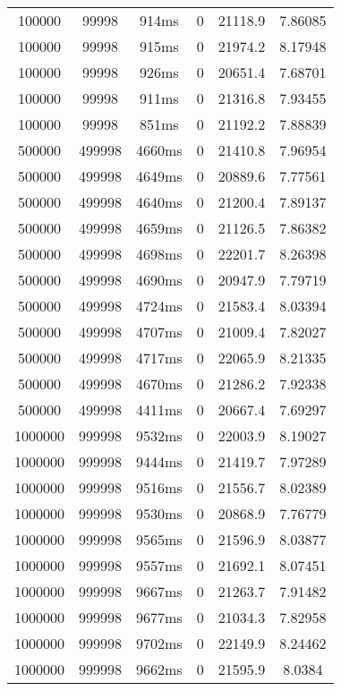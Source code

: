 \documentclass[./main.tex]{subfiles}
\begin{document}
\begin{table}
\begin{tabular}{ c | c | c | c | c | c }
        100000 & 99998 & 914ms & 0 & 21118.9 & 7.86085 \\
        100000 & 99998 & 915ms & 0 & 21974.2 & 8.17948 \\
        100000 & 99998 & 926ms & 0 & 20651.4 & 7.68701 \\
        100000 & 99998 & 911ms & 0 & 21316.8 & 7.93455 \\
        100000 & 99998 & 851ms & 0 & 21192.2 & 7.88839 \\
        \hline
        500000 & 499998 & 4660ms & 0 & 21410.8 & 7.96954 \\
        500000 & 499998 & 4649ms & 0 & 20889.6 & 7.77561 \\
        \rowcolor{lightgray} 500000 & 499998 & 4640ms & 0 & 21200.4 & 7.89137 \\
        500000 & 499998 & 4659ms & 0 & 21126.5 & 7.86382 \\
        500000 & 499998 & 4698ms & 0 & 22201.7 & 8.26398 \\
        500000 & 499998 & 4690ms & 0 & 20947.9 & 7.79719 \\
        500000 & 499998 & 4724ms & 0 & 21583.4 & 8.03394 \\
        500000 & 499998 & 4707ms & 0 & 21009.4 & 7.82027 \\
        500000 & 499998 & 4717ms & 0 & 22065.9 & 8.21335 \\
        500000 & 499998 & 4670ms & 0 & 21286.2 & 7.92338 \\
        500000 & 499998 & 4411ms & 0 & 20667.4 & 7.69297 \\
        \hline
        1000000 & 999998 & 9532ms & 0 & 22003.9 & 8.19027 \\
        1000000 & 999998 & 9444ms & 0 & 21419.7 & 7.97289 \\
        \rowcolor{lightgray} 1000000 & 999998 & 9516ms & 0 & 21556.7 & 8.02389 \\
        1000000 & 999998 & 9530ms & 0 & 20868.9 & 7.76779 \\
        1000000 & 999998 & 9565ms & 0 & 21596.9 & 8.03877 \\
        1000000 & 999998 & 9557ms & 0 & 21692.1 & 8.07451 \\
        1000000 & 999998 & 9667ms & 0 & 21263.7 & 7.91482 \\
        1000000 & 999998 & 9677ms & 0 & 21034.3 & 7.82958 \\
        1000000 & 999998 & 9702ms & 0 & 22149.9 & 8.24462 \\
        1000000 & 999998 & 9662ms & 0 & 21595.9 & 8.0384 \\

\end{tabular}
\end{table}
\end{document}
